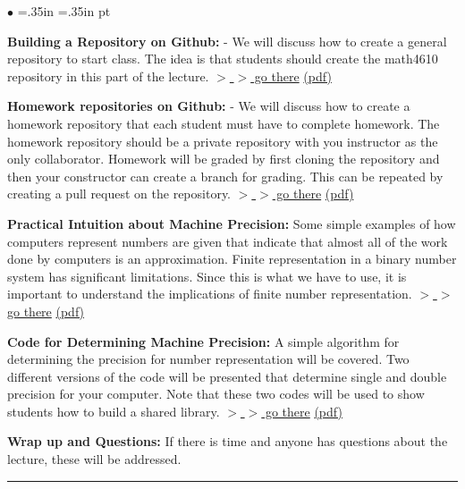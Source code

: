 \documentclass[10pt,fleqn]{article}
\begin{document}
\begin{list}{$\bullet$}{ \parsep=0pt \listparindent=0pt
\topsep=0pt \rightmargin=.35in \leftmargin=.35in  pt
\itemsep=2pt}
  \item {\bf Building a Repository on Github:} - We will discuss how to create a
     general repository to start class. The idea is that students should create
     the math4610 repository in this part of the lecture.
     \href{https://jvkoebbe.github.io/math4610/lectures/lecture_02/md/newrepository_primer}{$>$ $>$ go there}
     \href{https://jvkoebbe.github.io/math4610/lectures/lecture_02/pdf/newrepository_primer.pdf}{(pdf)}
  \item {\bf Homework repositories on Github:} - We will discuss how to create a
     homework repository that each student must have to complete homework. The
     homework repository should be a private repository with you instructor as
     the only collaborator. Homework will be graded by first cloning the
     repository and then your constructor can create a branch for grading. This
     can be repeated by creating a pull request on the repository.
     \href{https://jvkoebbe.github.io/math4610/lectures/lecture_02/md/homework_description}{$>$ $>$ go there}
     \href{https://jvkoebbe.github.io/math4610/lectures/lecture_02/pdf/homework_description.pdf}{(pdf)}
  \item {\bf Practical Intuition about Machine Precision:} Some simple examples
     of how computers represent numbers are given that indicate that almost all
     of the work done by computers is an approximation. Finite representation in
     a binary number system has significant limitations. Since this is what we
     have to use, it is important to understand the implications of finite
     number representation.
     \href{https://jvkoebbe.github.io/math4610/lectures/lecture_02/html/error_practical_intuition.html}{$>$ $>$ go there}
     \href{https://jvkoebbe.github.io/math4610/lectures/lecture_02/pdf/error_practical_intuition.pdf}{(pdf)}
  \item {\bf Code for Determining Machine Precision:} A simple algorithm for
     determining the precision for number representation will be covered. Two
     different versions of the code will be presented that determine single and
     double precision for your computer. Note that these two codes will be used
     to show students how to build a shared library.
     \href{https://jvkoebbe.github.io/math4610/lectures/lecture_02/md/maceps}{$>$ $>$ go there}
     \href{https://jvkoebbe.github.io/math4610/lectures/lecture_02/pdf/maceps.pdf}{(pdf)}
  \item {\bf Wrap up and Questions:} If there is time and anyone has questions
        about the lecture, these will be addressed.
\end{list}
\vskip0.1in\hrule\vskip0.1in
\end{document}
